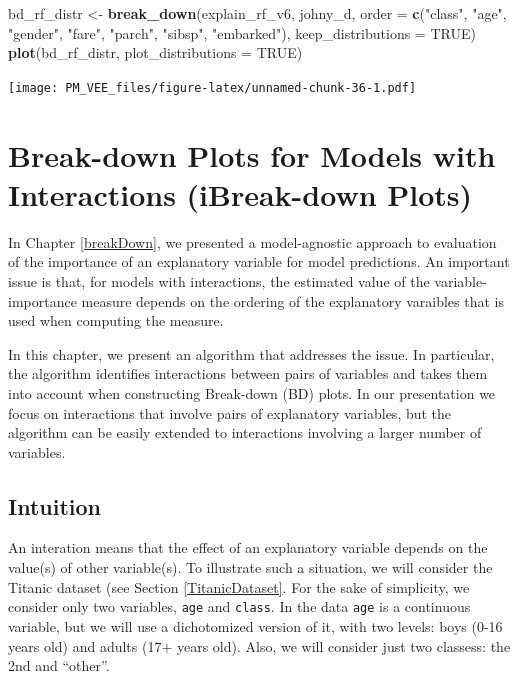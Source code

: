 \documentclass[12pt,]{krantz}
\newenvironment{Shaded}{\begin{snugshade}}{\end{snugshade}}
\newcommand{\DataTypeTok}[1]{\textcolor[rgb]{0.13,0.29,0.53}{#1}}
\newcommand{\KeywordTok}[1]{\textcolor[rgb]{0.13,0.29,0.53}{\textbf{#1}}}
\newcommand{\NormalTok}[1]{#1}
\newcommand{\OtherTok}[1]{\textcolor[rgb]{0.56,0.35,0.01}{#1}}
\newcommand{\StringTok}[1]{\textcolor[rgb]{0.31,0.60,0.02}{#1}}
\begin{document}
\begin{Shaded}
\begin{Highlighting}[]
\NormalTok{bd_rf_distr <-}\StringTok{ }\KeywordTok{break_down}\NormalTok{(explain_rf_v6,}
\NormalTok{                 johny_d,}
                 \DataTypeTok{order =} \KeywordTok{c}\NormalTok{(}\StringTok{"class"}\NormalTok{, }\StringTok{"age"}\NormalTok{, }\StringTok{"gender"}\NormalTok{, }\StringTok{"fare"}\NormalTok{, }\StringTok{"parch"}\NormalTok{, }\StringTok{"sibsp"}\NormalTok{, }\StringTok{"embarked"}\NormalTok{),}
                 \DataTypeTok{keep_distributions =} \OtherTok{TRUE}\NormalTok{)}
\KeywordTok{plot}\NormalTok{(bd_rf_distr, }\DataTypeTok{plot_distributions =} \OtherTok{TRUE}\NormalTok{) }
\end{Highlighting}
\end{Shaded}

\texttt{[image: PM\_VEE\_files/figure-latex/unnamed-chunk-36-1.pdf]}

\hypertarget{iBreakDown}{%
\section{Break-down Plots for Models with Interactions (iBreak-down Plots)}\label{iBreakDown}}

In Chapter \ref{breakDown}, we presented a model-agnostic approach to evaluation of the importance of an explanatory variable for model predictions. An important issue is that, for models with interactions, the estimated value of the variable-importance measure depends on the ordering of the explanatory varaibles that is used when computing the measure.

In this chapter, we present an algorithm that addresses the issue. In particular, the algorithm identifies interactions between pairs of variables and takes them into account when constructing Break-down (BD) plots. In our presentation we focus on interactions that involve pairs of explanatory variables, but the algorithm can be easily extended to interactions involving a larger number of variables.

\hypertarget{iBDIntuition}{%
\subsection{Intuition}\label{iBDIntuition}}

An interation means that the effect of an explanatory variable depends on the value(s) of other variable(s). To illustrate such a situation, we will consider the Titanic dataset (see Section \ref{TitanicDataset}. For the sake of simplicity, we consider only two variables, \texttt{age} and \texttt{class}. In the data \texttt{age} is a continuous variable, but we will use a dichotomized version of it, with two levels: boys (0-16 years old) and adults (17+ years old). Also, we will consider just two classess: the 2nd and ``other''.
\end{document}
